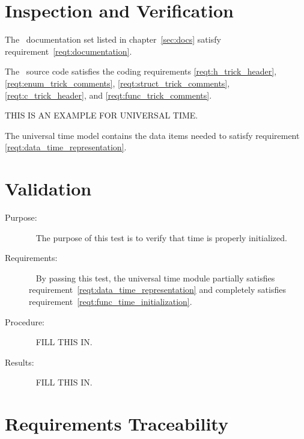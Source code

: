 \documentclass[twoside,11pt,titlepage]{report}
\begin{document}
\chapter{Inspection and Verification}\label{sec:inspect}

\label{inspect:documentation}

The \MODEL\ documentation set listed in chapter~\ref{sec:docs}
satisfy requirement~\ref{reqt:documentation}.

\label{inspect:code}
The \MODEL\ source code satisfies the coding requirements
\ref{reqt:h_trick_header},
\ref{reqt:enum_trick_comments},
\ref{reqt:struct_trick_comments},
\ref{reqt:c_trick_header}, and
\ref{reqt:func_trick_comments}.


THIS IS AN EXAMPLE FOR UNIVERSAL TIME.

\label{inspect:data_time_representation}
The universal time model contains the data items needed to satisfy
requirement \ref{reqt:data_time_representation}.

\chapter{Validation}\label{sec:test}

\label{test:func_time_initialization}
\begin{description}
\item[Purpose:] \ \newline
The purpose of this test is to verify that time is properly initialized.
\item[Requirements:] \ \newline
By passing this test, the universal time module partially satisfies
requirement~\ref{reqt:data_time_representation} and completely satisfies
requirement~\ref{reqt:func_time_initialization}.
\item[Procedure:]\ \newline
FILL THIS IN.
\item[Results:]\ \newline
FILL THIS IN.
\end{description}


\chapter{Requirements Traceability}\label{sec:traceability}
\end{document}
